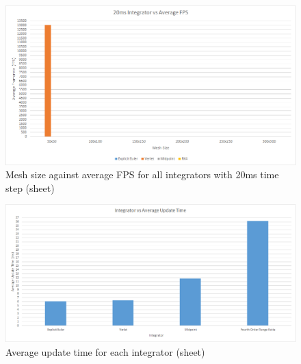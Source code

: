\begin{landscape}
    \begin{figure}[!htb]
    \begin{center}
      \includegraphics{Figures/sheet_20ms_int_fps}
    \end{center}
    \caption{Mesh size against average FPS for all integrators with 20ms time step (sheet)}
    \label{fig:20ms fps sheet}
  \end{figure}
  
    \begin{figure}[!htb]
    \begin{center}
      \includegraphics{Figures/sheet_int_ut}
    \end{center}
    \caption{Average update time for each integrator (sheet)}
    \label{fig:ut sheet}
  \end{figure}

\end{landscape}

